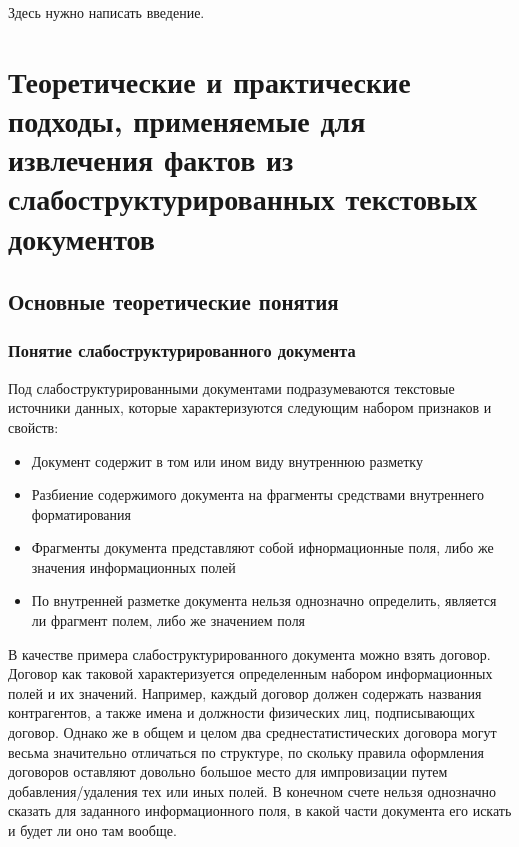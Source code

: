 





\Intro

Здесь нужно написать введение.

\chapter{Теоретические и практические подходы, применяемые для извлечения фактов из слабоструктурированных текстовых документов}
\section{Основные теоретические понятия}
\subsection{Понятие слабоструктурированного документа}
Под слабоструктурированными документами подразумеваются текстовые источники данных, которые характеризуются следующим набором признаков и свойств:
\begin{itemize}
  \item Документ содержит в том или ином виду внутреннюю разметку
  \item Разбиение содержимого документа на фрагменты средствами внутреннего форматирования
  \item Фрагменты документа представляют собой ифнормационные поля, либо же значения информационных полей
  \item По внутренней разметке документа нельзя однозначно определить, является ли фрагмент полем, либо же значением поля
\end{itemize}
В качестве примера слабоструктурированного документа можно взять договор. Договор как таковой характеризуется определенным набором информационных полей и их значений. Например, каждый договор должен содержать названия контрагентов, а также имена и должности физических лиц, подписывающих договор. Однако же в общем и целом два среднестатистических договора могут весьма значительно отличаться по структуре, по скольку правила оформления договоров оставляют довольно большое место для импровизации путем добавления/удаления тех или иных полей. В конечном счете нельзя однозначно сказать для заданного информационного поля, в какой части документа его искать и будет ли оно там вообще.

